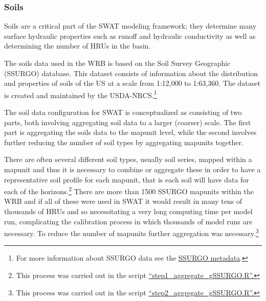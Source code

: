 \subsubsection{Soils}
Soils are a critical part of the SWAT modeling framework; they determine many surface hydraulic properties such as runoff and hydraulic conductivity as well as determining the number of HRUs in the basin.   


The soils data used in the WRB is based on the Soil Survey Geographic (SSURGO) database. This dataset consists of information about the distribution and properties of soils of the US at a scale from 1:12,000 to 1:63,360. The dataset is created and maintained by the USDA-NRCS.\footnote{For more information about SSURGO data see the \href{http://www.nrcs.usda.gov/wps/portal/nrcs/detail/soils/survey/?cid=nrcs142p2_053631}{SSURGO metadata}. }

The soil data configuration for SWAT is conceptualized as consisting of two parts, both involving aggregating soil data to a larger (coarser) scale. The first part is aggregating the soils data to the mapunit level, while the second involves further reducing the number of soil types by aggregating mapunits together.		

There are often several different soil types, usually soil series, mapped within a mapunit and thus it is necessary to combine or aggregate these in order to have a representative soil profile for each mapunit, that is each soil will have data for each of the horizons.\footnote{This process was carried out in the script \href{https://github.com/dnrwaterqualitymodeling/wisconsinRiverTMDL/blob/master/soils/step1_aggregate_gSSURGO.R}{``step1\_aggregate\_gSSURGO.R''.}} There are more than 1500 SSURGO mapunits within the WRB and if all of these were used in SWAT it would result in many tens of thousands of HRUs and so necessitating a very long computing time per model run, complicating the calibration process in which thousands of model runs are necessary. To reduce the number of mapunits further aggregation was necessary.\footnote{This process was carried out in the script \href{https://github.com/dnrwaterqualitymodeling/wisconsinRiverTMDL/blob/master/soils/step2_aggregate_gSSURGO.R}{``step2\_aggregate\_gSSURGO.R''.}}
 
